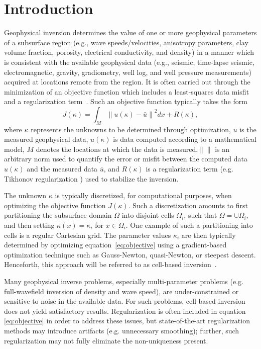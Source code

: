 \documentclass[manuscript,revised]{geophysics}
\newcommand\norm[1]{\left\lVert#1\right\rVert}
\begin{document}
\section{Introduction}
Geophysical inversion determines the value of one or more geophysical parameters of a subsurface region (e.g., wave speeds/velocities, anisotropy parameters, clay volume fraction, porosity, electrical conductivity, and density) in a manner which is consistent with the available geophysical data (e.g., seismic, time-lapse seismic, electromagnetic, gravity, gradiometry, well log, and well pressure measurements)  acquired at locations remote from the region.  It is often carried out through the minimization of an objective function which includes a least-squares data misfit and a regularization term~\cite[]{Parker_1994}. Such an objective function typically takes the form
\begin{equation} \label{eq:objective}
J\left(\kappa\right) = \int_M \norm{u(\kappa)-\bar{u}}^2  dx + R\left(\kappa\right),
\end{equation}
where $\kappa$ represents the unknowns to be determined through optimization, $\bar{u}$ is the measured geophysical data, $u(\kappa)$ is data computed according to a mathematical model, $M$ denotes the locations at which the data is measured,$\norm{}$ is an arbitrary norm used to quantify the error or misfit between the computed data $u(\kappa)$ and the measured data $\bar{u}$, and $R\left(\kappa\right)$ is a regularization term (e.g. Tikhonov regularization ) used to stabilize the inversion. 

The unknown $\kappa$ is typically discretized, for computational purposes, when optimizing the objective function $J\left(\kappa\right)$. Such a discretization amounts to first partitioning the subsurface domain $\Omega$ into disjoint cells $\Omega_i$, such that $\Omega = \cup\Omega_i$, and then setting $\kappa(x)=\kappa_i$ for $x \in \Omega_i$.  One example of such a partitioning into cells is a regular Cartesian grid. The parameter values ${\kappa_i}$ are then typically determined by optimizing equation~\ref{eq:objective} using a gradient-based optimization technique such as Gauss-Newton, quasi-Newton, or steepest descent. Henceforth, this approach will be referred to as cell-based inversion~\cite[]{Aster_2013}.

Many geophysical inverse problems, especially multi-parameter problems (e.g. full-wavefield inversion of density and wave speed), are under-constrained or sensitive to noise in the available data.  For such problems, cell-based inversion does not yield satisfactory results.  Regularization is often included in equation \ref{eq:objective} in order to address these issues, but state-of-the-art regularization methods may introduce artifacts (e.g. unnecessary smoothing); further, such regularization may not fully eliminate the non-uniqueness present.  
\end{document}

